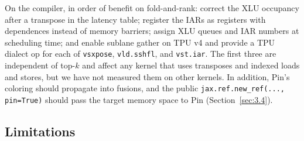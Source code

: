 \documentclass[sigconf,nonacm,balance=false]{acmart}
\newcommand{\code}[1]{\texttt{#1}}
\begin{document}
On the compiler, in order of benefit on fold-and-rank: correct the XLU occupancy after a transpose in the latency table; register the IARs as registers with dependences instead of memory barriers; assign XLU queues and IAR numbers at scheduling time; and enable sublane gather on TPU v4 and provide a TPU dialect op for each of \code{vsxpose}, \code{vld.\allowbreak{}sshfl}, and \code{vst.\allowbreak{}iar}. The first three are independent of top-$k$ and affect any kernel that uses transposes and indexed loads and stores, but we have not measured them on other kernels. In addition, Pin's coloring should propagate into fusions, and the public \code{jax.\allowbreak{}ref.\allowbreak{}new\_\allowbreak{}ref(\allowbreak{}.\allowbreak{}.\allowbreak{}.\allowbreak{},\allowbreak{} pin=\allowbreak{}True)} should pass the target memory space to Pin (Section~\ref{sec:3.4}).

\subsection{Limitations}
\label{sec:9.3}
\end{document}

